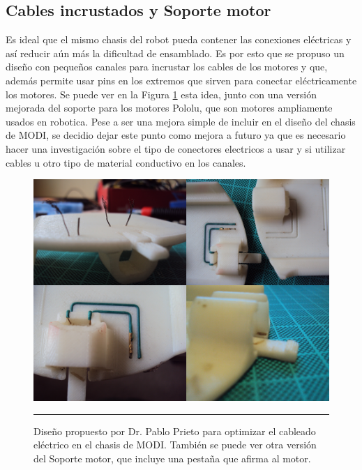 \subsection{Cables incrustados y Soporte motor}
Es ideal que el mismo chasis del robot pueda contener las conexiones eléctricas y así reducir aún más la dificultad de ensamblado. Es por esto que se propuso un diseño con pequeños canales para incrustar los cables de los motores y que, además permite usar pins en los extremos que sirven para conectar eléctricamente los motores. Se puede ver en la Figura \ref{fig:Cables incrustados} esta idea, junto con una versión mejorada del soporte para los motores Pololu, que son motores ampliamente usados en robotica.
Pese a ser una mejora simple de incluir en el diseño del chasis de MODI, se decidio dejar este punto como mejora a futuro ya que es necesario hacer una investigación sobre el tipo de conectores electricos a usar y si utilizar cables u otro tipo de material conductivo en los canales.

\begin{figure}[htbp]
	\centering
		\includegraphics[width=\textwidth]{./Pictures/wires.png}
		\rule{35em}{0.5pt}
	\caption[Cables incrustados y Soporte motor]{Diseño propuesto por Dr. Pablo Prieto para optimizar el cableado eléctrico en el chasis de MODI. También se puede ver otra versión del Soporte motor, que incluye una pestaña que afirma al motor.}
	\label{fig:Cables incrustados}
\end{figure}	






